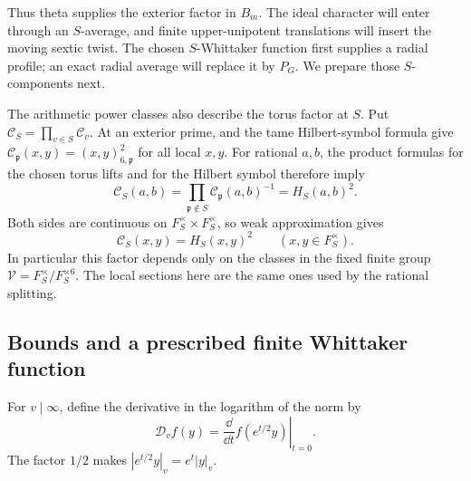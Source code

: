Thus theta supplies the exterior factor in \(B_m\).  The ideal character
will enter through an \(S\)-average, and finite upper-unipotent translations
will insert the moving sextic twist.  The chosen \(S\)-Whittaker function
first supplies a radial profile; an exact radial average will replace it
by \(P_G\).  We prepare those \(S\)-components next.

The arithmetic power classes also describe the torus factor at \(S\).
Put \(\mathcal C_S=\prod_{v\in S}\mathcal C_v\).  At an exterior prime,
 and the tame Hilbert-symbol formula give
\(\mathcal C_{\mathfrak p}(x,y)=(x,y)_{6,\mathfrak p}^{2}\) for all
local \(x,y\).  For rational \(a,b\), the product formulas for the chosen
torus lifts and for the Hilbert symbol therefore imply
\[
 \mathcal C_S(a,b)
 =\prod_{\mathfrak p\notin S}\mathcal C_{\mathfrak p}(a,b)^{-1}
 =H_S(a,b)^2.
\]
Both sides are continuous on \(F_S^\times\times F_S^\times\), so weak
approximation gives
\begin{equation}\label{eq:reflection-S-cocycle}
 \mathcal C_S(x,y)=H_S(x,y)^2
 \qquad(x,y\in F_S^\times).
\end{equation}
In particular this factor depends only on the classes in the fixed finite
group \(\mathcal V=F_S^\times/F_S^{\times6}\).  The local sections here
are the same ones used by the rational splitting.

\subsection{Bounds and a prescribed finite Whittaker function}

For \(v\mid\infty\), define the derivative in the logarithm of the norm by
\[
 \mathcal D_v f(y)
  =\left.\frac{\dd}{\dd t}f(e^{t/2}y)\right|_{t=0}.
\]
The factor \(1/2\) makes
\(|e^{t/2}y|_v=e^t|y|_v\).

